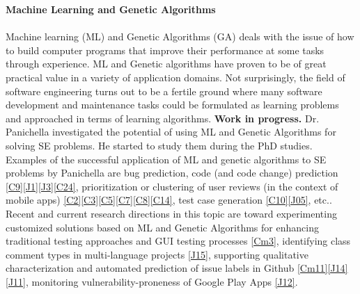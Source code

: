 \documentclass[10pt]{article}
\newcommand{\blankline}{\quad\pagebreak[3]}
\begin{document}
\textbf{Machine Learning and Genetic Algorithms}
\blankline\\\\
Machine learning (ML) and Genetic Algorithms (GA) deals with the issue of how to build computer programs that improve their performance at some tasks through experience. ML and Genetic algorithms have proven to be of great practical value in a variety of application domains. Not surprisingly, the field of software engineering turns out to be a fertile ground where many software development and maintenance tasks could be formulated as learning problems and approached in terms of learning algorithms. 
   \textbf{Work in progress.} Dr. Panichella investigated the potential of using ML and Genetic Algorithms for solving SE problems. He started to study them during the PhD studies. Examples of the successful application of  ML and genetic algorithms to SE problems by Panichella are  bug prediction, code (and code change) prediction  \ref{C9}\ref{J1}\ref{J3}\ref{C24},  
 prioritization or clustering of user reviews (in the context of mobile apps) \ref{C2}\ref{C3}\ref{C5}\ref{C7}\ref{C8}\ref{C14}, test case generation \ref{C10}\ref{J05}, etc..  Recent and current research directions in this topic are toward experimenting customized solutions based on ML and Genetic Algorithms for enhancing traditional testing approaches and GUI testing processes \ref{Cm3}, identifying class comment types in multi-language projects \ref{J15}, supporting qualitative characterization and automated prediction of issue labels in Github \ref{Cm11}\ref{J14}\ref{J11},  monitoring vulnerability-proneness of Google Play Apps \ref{J12}.
  \\
   \\
\end{document}

